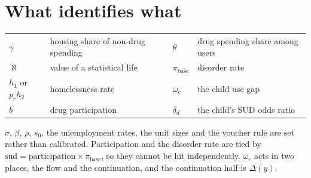 \documentclass[11pt]{article}
\begin{document}
\section*{What identifies what}
\begin{tabular}{@{}ll@{\hskip 3em}ll@{}}
\toprule
$\gamma$ & housing share of non-drug spending & $\theta$ & drug spending share among users\\
$\aleph$ & value of a statistical life & $\pi_{\text{base}}$ & disorder rate\\
$h_1$ or $p_rh_2$ & homelessness rate & $\omega_c$ & the child use gap\\
$b$ & drug participation & $\delta_d$ & the child's SUD odds ratio\\
\bottomrule
\end{tabular}

\medskip
\noindent$\sigma$, $\beta$, $\rho$, $s_0$, the unemployment rates, the unit sizes
and the voucher rule are set rather than calibrated. Participation and the
disorder rate are tied by $\text{sud}=\text{participation}\times\pi_{\text{base}}$,
so they cannot be hit independently. $\omega_c$ acts in two places, the flow and
the continuation, and the continuation half is $\Delta(y)$.
\end{document}
